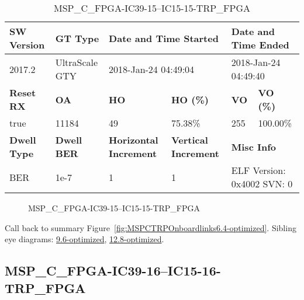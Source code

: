 \begin{table}[h]
\centering
\caption{MSP\_C\_FPGA-IC39-15--IC15-15-TRP\_FPGA}
\label{tab:MSPCFPGAIC3915IC1515TRPFPGA6.4-optimized}
\begin{tabular}{@{}|l|l|l|l|l|l|@{}}
\toprule
\textbf{SW Version}                & \textbf{GT Type}   & \multicolumn{2}{l|}{\textbf{Date and Time Started}}            & \multicolumn{2}{l|}{\textbf{Date and Time Ended}}        \\ \midrule
2017.2                       & UltraScale GTY          & \multicolumn{2}{l|}{2018-Jan-24 04:49:04}                   & \multicolumn{2}{l|}{2018-Jan-24 04:49:40}               \\ \midrule
\textbf{Reset RX}                  & \textbf{OA} & \textbf{HO}   & \textbf{HO (\%)} & \textbf{VO} & \textbf{VO (\%)} \\ \midrule
true & 11184        & 49          & 75.38\%        & 255        & 100.00\%       \\ \midrule
\textbf{Dwell Type}                & \textbf{Dwell BER} & \textbf{Horizontal Increment} & \textbf{Vertical Increment}    & \multicolumn{2}{l|}{\textbf{Misc Info}}                  \\ \midrule
BER                            & 1e-7        & 1        & 1           & \multicolumn{2}{l|}{ELF Version: 0x4002 SVN: 0}                         \\ \bottomrule
\end{tabular}
\end{table}

\begin{figure}[h]
\caption{MSP\_C\_FPGA-IC39-15--IC15-15-TRP\_FPGA} \label{fig:MSPCFPGAIC3915IC1515TRPFPGA6.4-optimized}
\end{figure}

Call back to summary Figure~\ref{fig:MSPCTRPOnboardlinks6.4-optimized}.
Sibling eye diagrams: \hyperref[sec:MSPCFPGAIC3915IC1515TRPFPGA9.6-optimized]{9.6-optimized}, \hyperref[sec:MSPCFPGAIC3915IC1515TRPFPGA12.8-optimized]{12.8-optimized}.

\clearpage
\newpage


\subsection{MSP\_C\_FPGA-IC39-16--IC15-16-TRP\_FPGA}\label{sec:MSPCFPGAIC3916IC1516TRPFPGA6.4-optimized}

